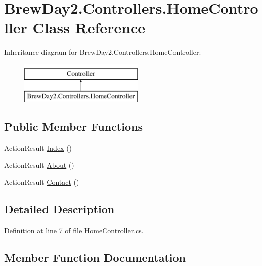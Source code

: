\hypertarget{class_brew_day2_1_1_controllers_1_1_home_controller}{}\section{Brew\+Day2.\+Controllers.\+Home\+Controller Class Reference}
\label{class_brew_day2_1_1_controllers_1_1_home_controller}
Inheritance diagram for Brew\+Day2.\+Controllers.\+Home\+Controller\+:\begin{figure}[H]
\begin{center}
\leavevmode
\includegraphics[height=2.000000cm]{class_brew_day2_1_1_controllers_1_1_home_controller}
\end{center}
\end{figure}
\subsection*{Public Member Functions}
\begin{DoxyCompactItemize}
\item 
Action\+Result \mbox{\hyperlink{class_brew_day2_1_1_controllers_1_1_home_controller_afc978e14b8c2291b08bea04a6364b021}{Index}} ()
\item 
Action\+Result \mbox{\hyperlink{class_brew_day2_1_1_controllers_1_1_home_controller_a6ff6c4bcd55b68a81cde033c700204af}{About}} ()
\item 
Action\+Result \mbox{\hyperlink{class_brew_day2_1_1_controllers_1_1_home_controller_a739e94a75fb382a8d53990c7ca458ff8}{Contact}} ()
\end{DoxyCompactItemize}


\subsection{Detailed Description}


Definition at line 7 of file Home\+Controller.\+cs.



\subsection{Member Function Documentation}
\mbox{\label{class_brew_day2_1_1_controllers_1_1_home_controller_a6ff6c4bcd55b68a81cde033c700204af}} 
